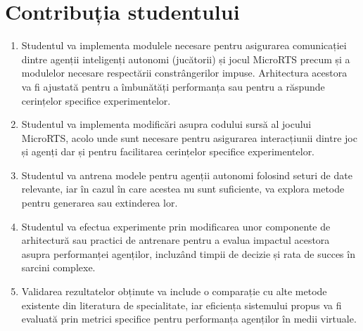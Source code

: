 \documentclass[12pt,a4paper]{article}
\begin{document}
\section {\textbf{Contribuția studentului} }
    \begin{enumerate}
        \item Studentul va implementa modulele necesare pentru asigurarea comunicației dintre agenții inteligenți autonomi (jucătorii) și jocul MicroRTS precum și a modulelor necesare respectării constrângerilor impuse. Arhitectura acestora va fi ajustată pentru a îmbunătăți performanța sau pentru a răspunde cerințelor specifice experimentelor.

        \item Studentul va implementa modificări asupra codului sursă al jocului MicroRTS, acolo unde sunt necesare pentru asigurarea interacțiunii dintre joc și agenți dar și pentru facilitarea cerințelor specifice experimentelor.

        \item Studentul va antrena modele pentru agenții autonomi folosind seturi de date relevante, iar în cazul în care acestea nu sunt suficiente, va explora metode pentru generarea sau extinderea lor.

        \item Studentul va efectua experimente prin modificarea unor componente de arhitectură sau practici de antrenare pentru a evalua impactul acestora asupra performanței agenților, incluzând timpii de decizie și rata de succes în sarcini complexe.

        \item Validarea rezultatelor obținute va include o comparație cu alte metode existente din literatura de specialitate, iar eficiența sistemului propus va fi evaluată prin metrici specifice pentru performanța agenților în medii virtuale.
    \end{enumerate}
\end{document}
